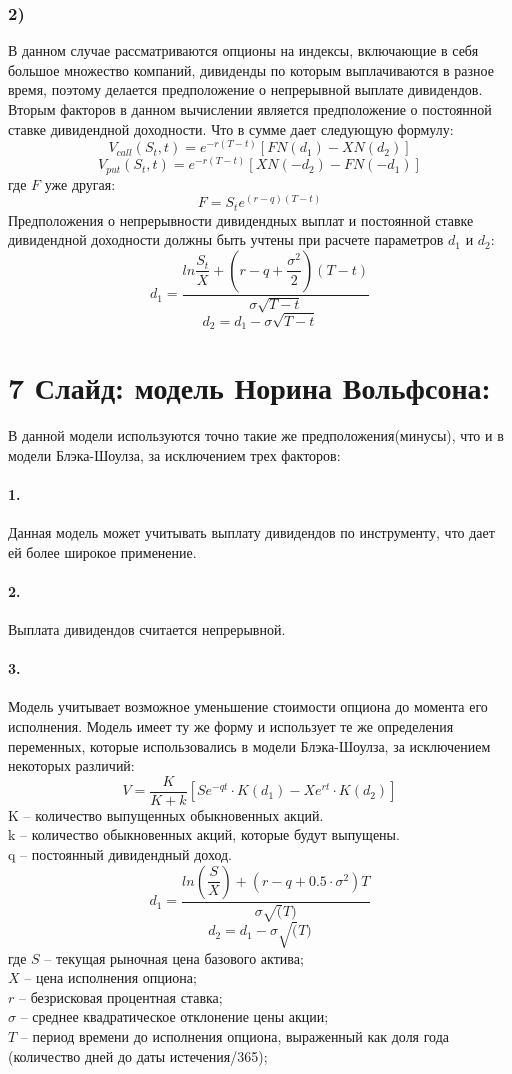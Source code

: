 \documentclass[a4paper]{article}
\begin{document}
\subsubsection*{2)}
В данном случае рассматриваются опционы на индексы, включающие в себя большое множество компаний, дивиденды по которым выплачиваются в разное время, поэтому делается предположение о непрерывной выплате дивидендов. Вторым факторов в данном вычислении является предположение о постоянной ставке дивидендной доходности. Что в сумме дает следующую формулу:
\[V_{call}(S_t, t) = e^{-r(T - t)} \left[ F N(d_1) - X N(d_2) \right]\]
\[V_{put}(S_t, t) = e^{-r(T - t)} \left[ X N(-d_2) - F N(-d_1) \right]\]
где $F$ уже другая:
\[F = S_t e^{(r - q) (T- t)}\]
Предположения о непрерывности дивидендных выплат и постоянной ставке дивидендной доходности должны быть учтены при расчете параметров $d_1$ и $d_2$:
\[d_1 = \dfrac{ln \dfrac{S_t}{X} + \left(r - q + \dfrac{\sigma^2}{2} \right) (T - t)}{\sigma \sqrt{T - t}}\]
\[d_2 = d_1 - \sigma \sqrt{T - t}\]





\section*{7 Слайд: модель Норина Вольфсона:}
В данной модели используются точно такие же предположения(минусы), что и в модели Блэка-Шоулза, за исключением трех факторов:
\paragraph*{1.} Данная модель может учитывать выплату дивидендов по инструменту, что дает ей более широкое применение.
\paragraph*{2.} Выплата дивидендов считается непрерывной.
\paragraph*{3.} Модель учитывает возможное уменьшение стоимости опциона до момента его исполнения.
Модель имеет ту же форму и использует те же определения переменных, которые использовались в модели Блэка-Шоулза, за исключением некоторых различий:
\[V = \dfrac{K}{K+k} \left[ Se^{-qt} \cdot K(d_1) - Xe^{rt} \cdot K(d_2)\right]\]
K -- количество выпущенных обыкновенных акций. \\
k -- количество обыкновенных акций, которые будут выпущены.\\
q -- постоянный дивидендный доход.
\[d_1 = \dfrac{ ln \left( \dfrac{S}{X} \right) + (r - q + 0.5 \cdot \sigma^2) T}{\sigma \sqrt(T)}\]
\[d_2 = d_1 - \sigma \sqrt(T)\]
где $S$ -- текущая рыночная цена базового актива; \\
$X$ – цена исполнения опциона; \\ 
$r$ -- безрисковая процентная ставка; \\
$\sigma$ -- среднее квадратическое отклонение цены акции; \\
$T$ -- период времени до исполнения опциона, выраженный как доля года (количество дней до даты истечения/365);
\end{document}
